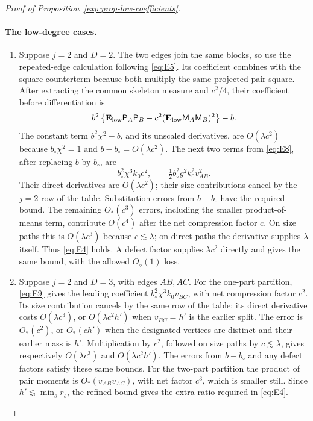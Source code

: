 \begin{proof}[Proof of Proposition~\ref{exp:prop-low-coefficients}]
\paragraph{The low-degree cases.}
\begin{enumerate}
\item Suppose \(j=2\) and \(D=2\). The two edges join the same
blocks, so use the repeated-edge calculation following \eqref{eq:E5}.
Its coefficient combines with the square counterterm because both
multiply the same projected pair square. After extracting the common
skeleton measure and \(c^2/4\), their coefficient before
differentiation is
\[
 b^2\left\{\mathbf E_{\rm low}\mathsf P_A\mathsf P_B
       -c^2(\mathbf E_{\rm low}\mathsf M_A\mathsf M_B)^2\right\}-b.
\]
The constant term \(b^2\chi^2-b\), and its unscaled derivatives, are
\(O(\lambda c^2)\) because \(b_\circ\chi^2=1\) and
\(b-b_\circ=O(\lambda c^2)\). The next two terms from \eqref{eq:E8},
after replacing \(b\) by \(b_\circ\), are
\[
 b_\circ^2\chi^3k_0c^2,
 \qquad \tfrac12b_\circ^2g^2k_0^2v_{AB}^2.
\]
Their direct derivatives are \(O(\lambda c^2)\); their size
contributions cancel by the \(j=2\) row of the table. Substitution
errors from \(b-b_\circ\) have the required bound. The remaining
\(O_*(c^3)\) errors, including the smaller product-of-means term,
contribute \(O(c^4)\) after the net compression factor \(c\).
On size paths this is \(O(\lambda c^3)\) because \(c\lesssim\lambda\);
on direct paths the derivative supplies \(\lambda\) itself.
Thus \eqref{eq:E4} holds. A defect factor supplies
\(\lambda c^2\) directly and gives the same bound, with the allowed
\(O_\diamond(1)\) loss.

\item Suppose \(j=2\) and \(D=3\), with edges \(AB,AC\).
For the one-part partition, \eqref{eq:E9} gives the leading
coefficient \(b_\circ^2\chi^3k_0v_{BC}\), with net compression
factor \(c^2\). Its size contribution cancels by the same row of
the table; its direct derivative costs \(O(\lambda c^3)\), or
\(O(\lambda c^2h')\) when \(v_{BC}=h'\) is the earlier split.
The error is \(O_*(c^2)\), or \(O_*(ch')\) when the designated
vertices are distinct and their earlier mass is \(h'\).
Multiplication by \(c^2\), followed on size paths by
\(c\lesssim\lambda\), gives respectively
\(O(\lambda c^3)\) and \(O(\lambda c^2h')\). The errors from
\(b-b_\circ\) and any defect factors satisfy these same bounds.
For the two-part partition the product of pair moments is
\(O_*(v_{AB}v_{AC})\), with net factor \(c^3\), which is smaller
still. Since \(h'\lesssim\min_s r_s\), the refined bound gives the
extra ratio required in \eqref{eq:E4}.


\end{enumerate}
\end{proof}
